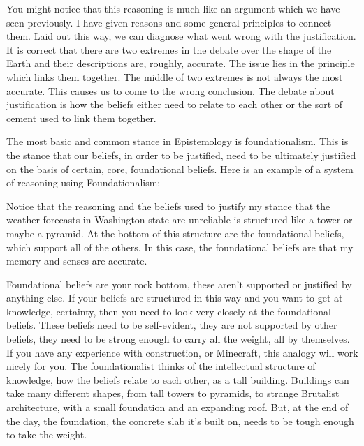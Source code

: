 You might notice that this reasoning is much like an argument which we have seen previously. I have given reasons and some general principles to connect them. Laid out this way, we can diagnose what went wrong with the justification. It is correct that there are two extremes in the debate over the shape of the Earth and their descriptions are, roughly, accurate. The issue lies in the principle which links them together. The middle of two extremes is not always the most accurate. This causes us to come to the wrong conclusion. The debate about justification is how the beliefs either need to relate to each other or the sort of cement used to link them together.

The most basic and common stance in Epistemology is \Gls{foundationalism}. This is the stance that our beliefs, in order to be justified, need to be ultimately justified on the basis of certain, core, foundational beliefs. Here is an example of a system of reasoning using Foundationalism: 


Notice that the reasoning and the beliefs used to justify my stance that the weather forecasts in Washington state are unreliable is structured like a tower or maybe a pyramid. At the bottom of this structure are the foundational beliefs, which support all of the others. In this case, the foundational beliefs are that my memory and senses are accurate. 

Foundational beliefs are your rock bottom, these aren't supported or justified by anything else. If your beliefs are structured in this way and you want to get at knowledge, certainty, then you need to look very closely at the foundational beliefs. These beliefs need to be self-evident, they are not  supported by other beliefs, they need to be strong enough to carry all the weight, all by themselves.  If you have any experience with construction, or Minecraft, this analogy will work nicely for you. The foundationalist thinks of the intellectual structure of knowledge, how the beliefs relate to each other, as a tall building. Buildings can take many different shapes, from tall towers to pyramids, to strange Brutalist architecture, with a small foundation and an expanding roof. But, at the end of the day, the foundation, the concrete slab it's built on, needs to be tough enough to take the weight. 

